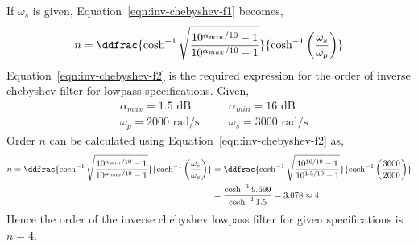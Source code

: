 If $\omega_s$ is given, Equation~\ref{eqn:inv-chebyshev-f1} becomes,
\begin{equation}
    n =\ddfrac{\cosh^{-1}\sqrt{\frac{10^{\alpha_{min}/10}-1}{10^{\alpha_{max}/10}-1}}}{\cosh^{-1} \left(\frac{\omega_s}{\omega_p}\right)}
    \label{eqn:inv-chebyshev-f2}
\end{equation}
Equation~\ref{eqn:inv-chebyshev-f2} is the required expression for the order of inverse chebyshev filter for lowpass specifications.
Given,
\begin{equation*}
   \begin{aligned}
      & \alpha_{max}=1.5 \text{ dB} \quad && \alpha_{min}=16 \text{ dB}\\
      & \omega_p=2000 \text{ rad/s} \quad && \omega_s=3000 \text{ rad/s}
   \end{aligned}
\end{equation*}
Order $n$ can be calculated using Equation~\ref{eqn:inv-chebyshev-f2} as,
\begin{equation*}
   \begin{aligned}
      n=\ddfrac{\cosh^{-1}\sqrt{\frac{10^{\alpha_{min}/10}-1}{10^{\alpha_{max}/10}-1}}}{\cosh^{-1} \left(\frac{\omega_s}{\omega_p}\right)}&=
      \ddfrac{\cosh^{-1}\sqrt{\frac{10^{16/10}-1}{10^{1.5/10}-1}}}{\cosh^{-1} \left(\frac{3000}{2000}\right)}\\
      &=\frac{\cosh^{-1}9.699}{\cosh^{-1}1.5}
      =3.078\approx4
   \end{aligned}
\end{equation*}
Hence the order of the inverse chebyshev lowpass filter for given specifications is $n=4$.